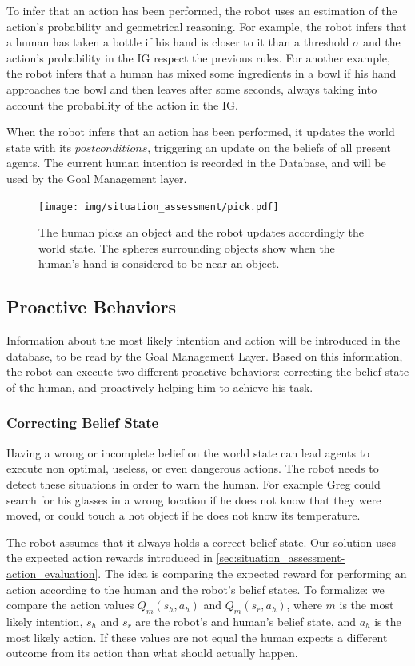 To infer that an action has been performed, the robot uses an estimation of the action's probability and geometrical reasoning. For example, the robot infers that a human has taken a bottle if his hand is closer to it than a threshold $\sigma$  and the action's probability in the IG respect the previous rules. For another example, the robot infers that a human has mixed some ingredients in a bowl if his hand approaches the bowl and then leaves after some seconds, always taking into account the probability of the action in the IG.

When the robot infers that an action has been performed, it updates the world state with its $postconditions$, triggering an update on the beliefs of all present agents. The current human intention is recorded in the Database, and will be used by the Goal Management layer.

 \begin{figure}[ht!]
	\centering
	\texttt{[image: img/situation\_assessment/pick.pdf]}
	\caption[Actions and world update]{The human picks an object and the robot updates accordingly the world state. The spheres surrounding objects show when the human's hand is considered to be near an object.}
	\label{fig:situation_assessment-pick}
\end{figure}


\subsection{Proactive Behaviors}
\label{subsec:situation_assessment-proactive_behaviors}
Information about the most likely intention and action will be introduced in the database, to be read by the Goal Management Layer. Based on this information, the robot can execute two different proactive behaviors: correcting the belief state of the human, and proactively helping him to achieve his task.

\subsubsection{Correcting Belief State}
Having a wrong or incomplete belief on the world state can lead agents to execute non optimal, useless, or even dangerous actions. The robot needs to detect these situations in order to warn the human. For example Greg could search for his glasses in a wrong location if he does not know that they were moved, or could touch a hot object if he does not know its temperature.

 The robot assumes that it always holds a correct belief state. Our solution uses the expected action rewards introduced in \ref{sec:situation_assessment-action_evaluation}. The idea is comparing the expected reward for performing an action according to the human and the robot's belief states. To formalize: we compare the action values \(Q_m(s_h,a_h)\) and \(Q_m(s_r,a_h)\), where $m$ is the most likely intention,  $s_h$ and $s_r$ are the robot's and human's belief state, and $a_h$ is the most likely action. If these values are not equal the human expects a different outcome from its action than what should actually happen. 

